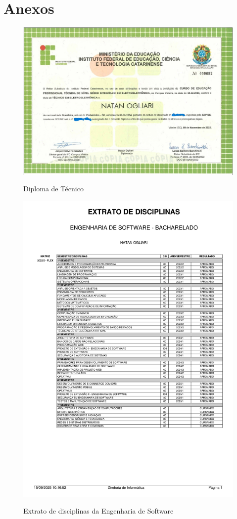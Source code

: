 

\section{Anexos}
\begin{figure}[H]
        \centering
        \caption{Diploma de Técnico}
        \includegraphics[width=1\textwidth]{figure/Doc/Diploma frente.jpg}
        \label{fig:diploma}
\end{figure}

\begin{figure}[H]
        \centering
        \caption{Extrato de disciplinas da Engenharia de Software}
        \includegraphics[width=1\textwidth]{figure/Doc/historico_2025-1.pdf}
        \label{fig:extrato}
\end{figure}
